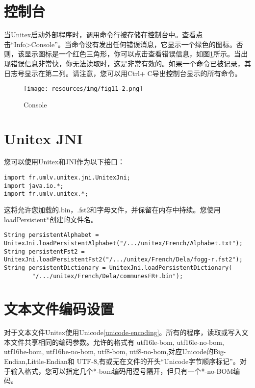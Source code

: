 \section{控制台}
\label{section-console}
当Unitex启动外部程序时，调用命令行被存储在控制台中。查看点击“Info>Console”。当命令没有发出任何错误消息，它显示一个绿色的图标。否则，该显示图标是一个红色三角形，你可以点击查看错误信息，如图\ref{fig-console}所示。当出现错误信息非常快，你无法读取时，这是非常有效的。如果一个命令已被记录，其日志号显示在第二列。请注意，您可以用Ctrl+ C导出控制台显示的所有命令。


\bigskip
\begin{figure}[!h]
\begin{center}
\texttt{[image: resources/img/fig11-2.png]}
\caption{Console\label{fig-console}}
\end{center}
\end{figure}

\section{Unitex JNI}
\label{section-unitex-JNI}

您可以使用Unitex和JNI作为以下接口：
\begin{verbatim}
import fr.umlv.unitex.jni.UnitexJni;
import java.io.*;
import fr.umlv.unitex.*;
\end{verbatim}
这将允许您加载的.bin，.fst2和字母文件，并保留在内存中持续。您使用loadPersistent*创建的文件名。


\begin{verbatim}
String persistentAlphabet = UnitexJni.loadPersistentAlphabet("/.../unitex/French/Alphabet.txt");
String persistentFst2 = UnitexJni.loadPersistentFst2("/.../unitex/French/Dela/fogg-r.fst2");
String persistentDictionary = UnitexJni.loadPersistentDictionary(
		"/.../unitex/French/Dela/communesFR+.bin");
\end{verbatim}


\section{文本文件编码设置}
\label{section-text-file-encoding-parameters}
对于文本文件Unitex使用Unicode\ref{unicode-encoding}。所有的程序，读取或写入文本文件共享相同的编码参数。允许的格式有 utf16le-bom, utf16le-no-bom, utf16be-bom, utf16be-no-bom, utf8-bom, utf8-no-bom,对应Unicode的Big-Endian,Little-Endian和
UTF-8,有或无在文件的开头“Unicode字节顺序标记”。对于输入格式，您可以指定几个*-bom编码用逗号隔开，但只有一个*-no-BOM编码。
 

